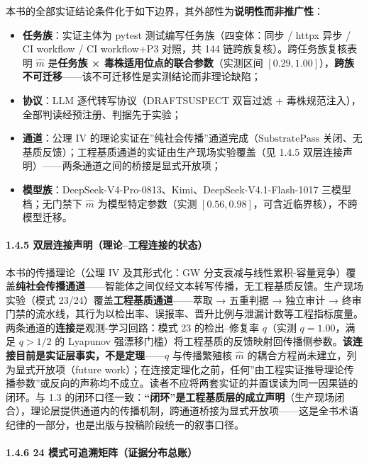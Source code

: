 \documentclass[
]{ctexart}
\providecommand{\tightlist}{%
  \setlength{\itemsep}{0pt}\setlength{\parskip}{0pt}}
\renewcommand{\_}{\discretionary{}{}{\textunderscore}}
\begin{document}
本书的全部实证结论条件化于如下边界，其外部性为\textbf{说明性而非推广性}：

\begin{itemize}
\tightlist
\item
  \textbf{任务族}：实证主体为 pytest 测试编写任务族（四变体：同步 /
  httpx 异步 / CI workflow / CI workflow+P3 对照，共 144
  链跨族复核）。跨任务族复核表明 \(\hat m\) 是\textbf{任务族 ×
  毒株适用位点的联合参数}（实测区间
  \([0.29,1.00]\)），\textbf{跨族不可迁移}------该不可迁移性是实测结论而非理论缺陷；
\item
  \textbf{协议}：LLM 逐代转写协议（DRAFT\_SUSPECT 双盲过滤 +
  毒株规范注入），全部判读经预注册、判据先于实验；
\item
  \textbf{通道}：公理 IV
  的理论实证在''纯社会传播''通道完成（\(\mathrm{SubstratePass}\)
  关闭、无基质反馈）；工程基质通道的实证由生产现场实验覆盖（见 1.4.5
  双层连接声明）------两条通道之间的桥接是显式开放项；
\item
  \textbf{模型族}：DeepSeek-V4-Pro-0813、Kimi、DeepSeek-V4.1-Flash-1017
  三模型档；无门禁下 \(\hat m\) 为模型特定参数（实测
  \([0.56,0.98]\)，可含近临界核），不跨模型迁移。
\end{itemize}

\paragraph{1.4.5
双层连接声明（理论--工程连接的状态）}\label{ux53ccux5c42ux8fdeux63a5ux58f0ux660eux7406ux8bbaux5de5ux7a0bux8fdeux63a5ux7684ux72b6ux6001}

本书的传播理论（公理 IV 及其形式化：GW
分支衰减与线性累积-容量竞争）覆盖\textbf{纯社会传播通道}------智能体之间仅经文本转写传播，无工程基质反馈。生产现场实验（模式
23/24）覆盖\textbf{工程基质通道}------萃取 → 五重判据 → 独立审计 →
终审门禁的流水线，其行为以检出率、误报率、晋升比例与泄漏计数等工程指标度量。两条通道的\textbf{连接}是观测-学习回路：模式
23 的检出--修复率 \(q\)（实测 \(q=1.00\)，满足 \(q>1/2\) 的 Lyapunov
强漂移门槛）将工程基质的反馈映射回传播侧参数。\textbf{该连接目前是实证层事实，不是定理}------\(q\)
与传播繁殖核 \(\hat m\) 的耦合方程尚未建立，列为显式开放项（future
work）；在连接定理化之前，任何''由工程实证推导理论传播参数''或反向的声称均不成立。读者不应将两套实证的并置误读为同一因果链的闭环。与
1.3
的闭环口径一致：\textbf{``闭环''是工程基质层的成立声明}（生产现场闭合），理论层提供通道内的传播机制，跨通道桥接为显式开放项------这是全书术语纪律的一部分，也是出版与投稿阶段统一的叙事口径。

\paragraph{1.4.6 24
模式可追溯矩阵（证据分布总账）}\label{ux6a21ux5f0fux53efux8ffdux6eafux77e9ux9635ux8bc1ux636eux5206ux5e03ux603bux8d26}
\end{document}
